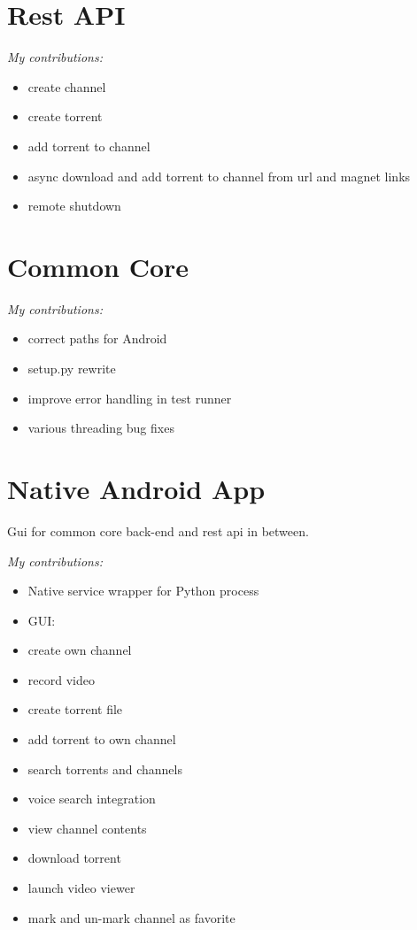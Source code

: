 \documentclass[]{report}
\begin{document}
\section{Rest API}

\emph{My contributions:}
\begin{itemize}
	\item create channel
	\item create torrent
	\item add torrent to channel
	\item async download and add torrent to channel from url and magnet links
	\item remote shutdown
\end{itemize}

\section{Common Core}

\emph{My contributions:}
\begin{itemize}
	\item correct paths for Android
	\item setup.py rewrite
	\item improve error handling in test runner
	\item various threading bug fixes
\end{itemize}


\section{Native Android App}
Gui for common core back-end and rest api in between.

\emph{My contributions:}
\begin{itemize}
	\item Native service wrapper for Python process
	\item GUI:
	\item create own channel
	\item record video
	\item create torrent file
	\item add torrent to own channel
	\item search torrents and channels
	\item voice search integration
	\item view channel contents
	\item download torrent
	\item launch video viewer
	\item mark and un-mark channel as favorite
\end{itemize}
\end{document}
